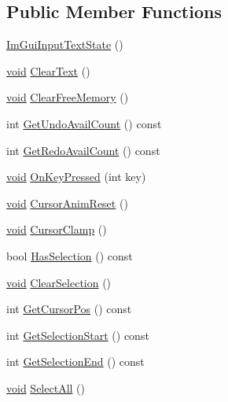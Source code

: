 \subsection*{Public Member Functions}
\begin{DoxyCompactItemize}
\item 
\hyperlink{structImGuiInputTextState_adc973b2e610237bdbede8e1fc01dcc5f}{Im\+Gui\+Input\+Text\+State} ()
\item 
\hyperlink{imgui__impl__opengl3__loader_8h_ac668e7cffd9e2e9cfee428b9b2f34fa7}{void} \hyperlink{structImGuiInputTextState_a451153353e47a2aee5ca6c4b362fe2c1}{Clear\+Text} ()
\item 
\hyperlink{imgui__impl__opengl3__loader_8h_ac668e7cffd9e2e9cfee428b9b2f34fa7}{void} \hyperlink{structImGuiInputTextState_a8be5f345ea5de89842d5a6716cb19b27}{Clear\+Free\+Memory} ()
\item 
int \hyperlink{structImGuiInputTextState_a466373ea612d3b3d2fe1449193850d5f}{Get\+Undo\+Avail\+Count} () const
\item 
int \hyperlink{structImGuiInputTextState_a96f6741c8556dbfe9c92f28faee063e3}{Get\+Redo\+Avail\+Count} () const
\item 
\hyperlink{imgui__impl__opengl3__loader_8h_ac668e7cffd9e2e9cfee428b9b2f34fa7}{void} \hyperlink{structImGuiInputTextState_a2cd5083f820d0012479bb706a45b04b0}{On\+Key\+Pressed} (int key)
\item 
\hyperlink{imgui__impl__opengl3__loader_8h_ac668e7cffd9e2e9cfee428b9b2f34fa7}{void} \hyperlink{structImGuiInputTextState_a78a05f36dbfd38b9026a4980a15a6a3e}{Cursor\+Anim\+Reset} ()
\item 
\hyperlink{imgui__impl__opengl3__loader_8h_ac668e7cffd9e2e9cfee428b9b2f34fa7}{void} \hyperlink{structImGuiInputTextState_a0924f1eead76c7d58090aa603cea4301}{Cursor\+Clamp} ()
\item 
bool \hyperlink{structImGuiInputTextState_ab17832413ff121a5663319c06bbb989a}{Has\+Selection} () const
\item 
\hyperlink{imgui__impl__opengl3__loader_8h_ac668e7cffd9e2e9cfee428b9b2f34fa7}{void} \hyperlink{structImGuiInputTextState_aa834c6b6c9f3d589b55eb22ca9a01c3e}{Clear\+Selection} ()
\item 
int \hyperlink{structImGuiInputTextState_a061d099bd9dad94fe86a435f48c7fe1e}{Get\+Cursor\+Pos} () const
\item 
int \hyperlink{structImGuiInputTextState_a408b8e34844be9aa85120589126e57d1}{Get\+Selection\+Start} () const
\item 
int \hyperlink{structImGuiInputTextState_a8b85a91b83de6605f251eb6d6f31a2e4}{Get\+Selection\+End} () const
\item 
\hyperlink{imgui__impl__opengl3__loader_8h_ac668e7cffd9e2e9cfee428b9b2f34fa7}{void} \hyperlink{structImGuiInputTextState_ac9ceb16a3551dc82a1e8be716236b811}{Select\+All} ()
\end{DoxyCompactItemize}

